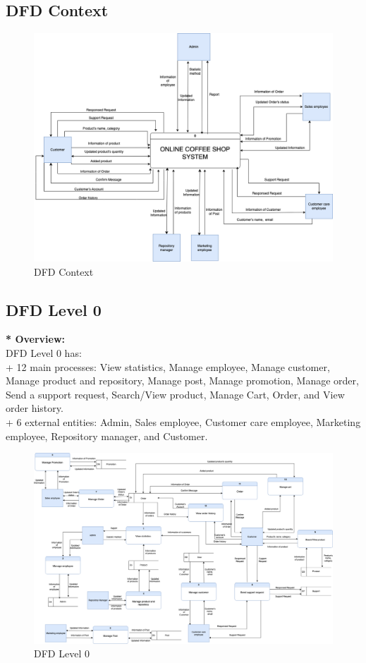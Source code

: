 \subsection{DFD Context}

\begin{figure}[H]
  \centering
  \includegraphics[width=1.1\textwidth]{DFDContext.png}
  \caption{DFD Context}
  \label{fig:dfdcontext}
\end{figure}

\subsection{DFD Level 0}
\textbf{* Overview:} \\
DFD Level 0 has: \\ 
+ 12 main processes: View statistics, Manage employee, Manage customer, Manage product and repository, Manage post, Manage promotion, Manage order, Send a support request, Search/View product, Manage Cart, Order, and View order history. \\
+ 6 external entities: Admin, Sales employee, Customer care employee, Marketing employee, Repository manager, and Customer.
\begin{figure}[H]
  \centering
  \includegraphics[width=1.1\textwidth]{DFDLevel0.png}
  \caption{DFD Level 0}
  \label{fig:dfdlevel0}
\end{figure}

